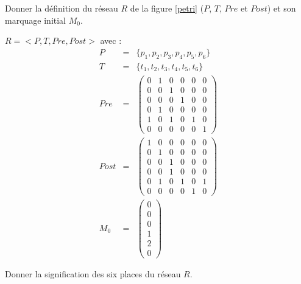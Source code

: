 \documentclass[a4paper]{article}
\begin{document}
\begin{questions}
\question Donner la définition du réseau $R$ de la figure \ref{petri} ($P$, $T$, $Pre$ et $Post$) et son marquage initial $M_0$. 

\begin{correction}{.8}
	$R = <P, T, Pre, Post>$ avec :
	\begin{eqnarray*}
	P &=& \{p_1, p_2, p_3, p_4, p_5, p_6\}\\
	T &=& \{t_1, t_2, t_3, t_4, t_5, t_6\}\\
	Pre &=& \begin{pmatrix}
		0 & 1 & 0 & 0 & 0 & 0 \\ %
		0 & 0 & 1 & 0 & 0 & 0 \\ %
		0 & 0 & 0 & 1 & 0 & 0 \\ %
		0 & 1 & 0 & 0 & 0 & 0 \\ %
		1 & 0 & 1 & 0 & 1 & 0 \\ %
		0 & 0 & 0 & 0 & 0 & 1    %
		\end{pmatrix}\\
	Post &=& \begin{pmatrix}
		1 & 0 & 0 & 0 & 0 & 0 \\ %
		0 & 1 & 0 & 0 & 0 & 0 \\ %
		0 & 0 & 1 & 0 & 0 & 0 \\ %
		0 & 0 & 1 & 0 & 0 & 0 \\ %
		0 & 1 & 0 & 1 & 0 & 1 \\ %
		0 & 0 & 0 & 0 & 1 & 0    %
		\end{pmatrix}\\
	M_0 &=& \begin{pmatrix} 0\\ 0\\ 0\\ 1\\ 2\\ 0\end{pmatrix}
	\end{eqnarray*}	
\end{correction}

\question Donner la signification des six places du réseau $R$. 


\end{questions}
\end{document}
